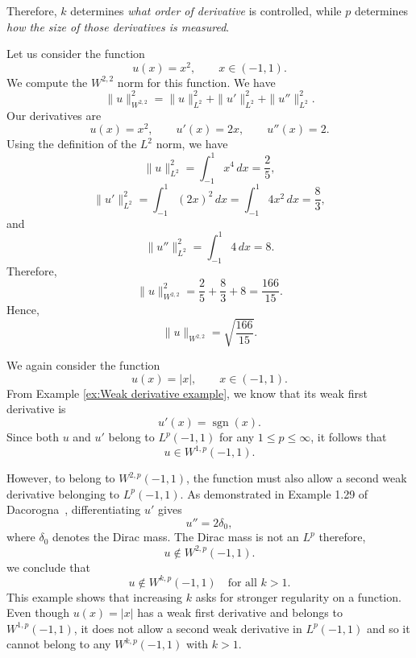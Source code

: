 Therefore, $k$ determines \textit{what order of derivative} is controlled, while $p$ determines \textit{how the size of those derivatives is measured}.

\begin{example}
    \label{ex:Sobolev general k}
    Let us consider the function
    \[
        u(x)=x^2, \qquad x\in(-1,1).
    \]
    We compute the $W^{2,2}$ norm for this function. We have
    \[
        \|u\|^2_{W^{2,2}}
        =
        \|u\|^2_{L^2}
        +
        \|u'\|^2_{L^2}
        +
        \|u''\|^2_{L^2}.
    \]
    Our derivatives are
    \[
        u(x)=x^2, \qquad u'(x)=2x, \qquad u''(x)=2.
    \]
    Using the definition of the $L^2$ norm, we have
    \[
        \|u\|_{L^2}^2
        =
        \int_{-1}^1 x^4\,dx
        =
        \frac{2}{5},
    \]
    \[
        \|u'\|_{L^2}^2
        =
        \int_{-1}^1 (2x)^2\,dx
        =
        \int_{-1}^1 4x^2\,dx
        =
        \frac{8}{3},
    \]
    and
    \[
        \|u''\|_{L^2}^2
        =
        \int_{-1}^1 4\,dx
        =
        8.
    \]
    Therefore,
    \[
        \|u\|_{W^{2,2}}^2
        =
        \frac{2}{5}
        +
        \frac{8}{3}
        +
        8
        =
        \frac{166}{15}.
    \]
    Hence,
    \[
        \|u\|_{W^{2,2}}
        =
        \sqrt{\frac{166}{15}}.
    \]
\end{example}

\begin{example}
\label{ex:Absolute value not Wkp}
We again consider the function
    \[  
    u(x)=|x|, \qquad x\in(-1,1).
    \]
From Example \ref{ex:Weak derivative example}, we know that its weak first derivative is
\[
    u'(x)=\operatorname{sgn}(x).
\]
Since both $u$ and $u'$ belong to $L^p(-1,1)$ for any
$1\leq p\leq\infty$, it follows that
\[  
u\in W^{1,p}(-1,1).
\]

However, to belong to $W^{2,p}(-1,1)$, the function must also allow a second weak derivative belonging to $L^p(-1,1)$. As demonstrated in Example 1.29 of Dacorogna~\cite[p.~30]{dacorogna}, differentiating $u'$ gives
\[
u''=2\delta_0,
\]
where $\delta_0$ denotes the Dirac mass. The Dirac mass is not an $L^p$ therefore,
\[
    u\notin W^{2,p}(-1,1).
\]
we conclude that
\[
    u\notin W^{k,p}(-1,1)
    \quad\text{for all } k>1.
\]
This example shows that increasing $k$ asks for stronger regularity on a function. Even though $u(x)=|x|$ has a weak first derivative and belongs to $W^{1,p}(-1,1)$, it does not allow a second weak derivative in $L^p(-1,1)$ and so it cannot belong to any $W^{k,p}(-1,1)$ with $k>1$.
\end{example}

